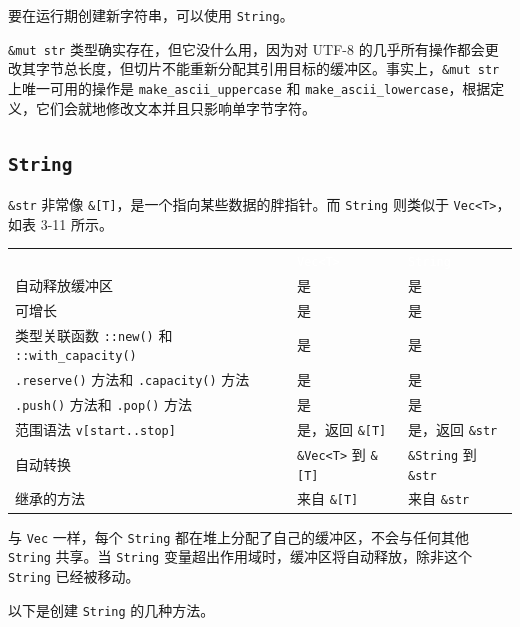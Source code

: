 要在运行期创建新字符串，可以使用 \texttt{String}。

\texttt{\&mut str} 类型确实存在，但它没什么用，因为对 UTF-8 的几乎所有操作都会更改其字节总长度，但切片不能重新分配其引用目标的缓冲区。事实上，\texttt{\&mut str} 上唯一可用的操作是 \texttt{make\_ascii\_uppercase} 和 \texttt{make\_ascii\_lowercase}，根据定义，它们会就地修改文本并且只影响单字节字符。

\subsection{\texttt{String}}

\texttt{\&str} 非常像 \texttt{\&[T]}，是一个指向某些数据的胖指针。而 \texttt{String} 则类似于 \texttt{Vec<T>}，如表 3-11 所示。


\myTableBegin
\begin{tabularx}{\textwidth}{@{}>{\hsize=1.203\hsize\raggedright\arraybackslash}X>{\hsize=0.898\hsize\raggedright\arraybackslash}X>{\hsize=0.898\hsize\raggedright\arraybackslash}X@{}}
\rowcolor{tabhead}\textcolor{white}{} & \textcolor{white}{\texttt{Vec<T>}} & \textcolor{white}{\texttt{String}} \\
自动释放缓冲区 & 是 & 是 \\
可增长 & 是 & 是 \\
类型关联函数 \texttt{::new()} 和 \texttt{::with\_capacity()} & 是 & 是 \\
\texttt{.reserve()} 方法和 \texttt{.capacity()} 方法 & 是 & 是 \\
\texttt{.push()} 方法和 \texttt{.pop()} 方法 & 是 & 是 \\
范围语法 \texttt{v[start..stop]} & 是，返回 \texttt{\&[T]} & 是，返回 \texttt{\&str} \\
自动转换 & \texttt{\&Vec<T>} 到 \texttt{\&[T]} & \texttt{\&String} 到 \texttt{\&str} \\
继承的方法 & 来自 \texttt{\&[T]} & 来自 \texttt{\&str} \\
\end{tabularx}
\myTableEnd

与 \texttt{Vec} 一样，每个 \texttt{String} 都在堆上分配了自己的缓冲区，不会与任何其他 \texttt{String} 共享。当 \texttt{String} 变量超出作用域时，缓冲区将自动释放，除非这个 \texttt{String} 已经被移动。

以下是创建 \texttt{String} 的几种方法。

